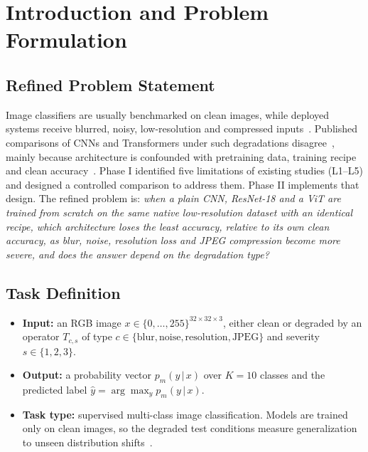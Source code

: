 \documentclass[conference]{IEEEtran}
\begin{document}
\section{Introduction and Problem Formulation}

\subsection{Refined Problem Statement}
Image classifiers are usually benchmarked on clean images, while deployed systems receive blurred, noisy, low-resolution and compressed inputs~\cite{hendrycks2019}. Published comparisons of CNNs and Transformers under such degradations disagree~\cite{bai2021,wang2023,liu2024}, mainly because architecture is confounded with pretraining data, training recipe and clean accuracy~\cite{erkara2026,liu2024}. Phase I identified five limitations of existing studies (L1--L5) and designed a controlled comparison to address them. Phase II implements that design. The refined problem is: \emph{when a plain CNN, ResNet-18 and a ViT are trained from scratch on the same native low-resolution dataset with an identical recipe, which architecture loses the least accuracy, relative to its own clean accuracy, as blur, noise, resolution loss and JPEG compression become more severe, and does the answer depend on the degradation type?}

\subsection{Task Definition}
\begin{itemize}
\item \textbf{Input:} an RGB image $x \in \{0,\dots,255\}^{32\times32\times3}$, either clean or degraded by an operator $T_{c,s}$ of type $c \in \{\text{blur}, \text{noise}, \text{resolution}, \text{JPEG}\}$ and severity $s \in \{1,2,3\}$.
\item \textbf{Output:} a probability vector $p_m(y\,|\,x)$ over $K = 10$ classes and the predicted label $\hat{y} = \arg\max_y p_m(y\,|\,x)$.
\item \textbf{Task type:} supervised multi-class image classification. Models are trained only on clean images, so the degraded test conditions measure generalization to unseen distribution shifts~\cite{hendrycks2019}.
\end{itemize}
\end{document}
